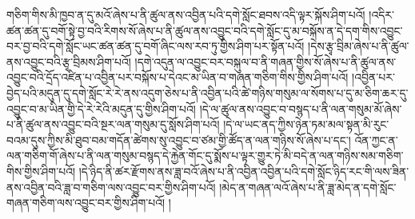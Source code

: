 གཅིག་གིས་མི་ཁྱབ་ན་དུ་མའོ་ཞེས་པ་ནི་ཚུལ་ནས་འབྱིན་པའི་དགེ་སློང་ཐབས་འདི་ལྟར་སྐོས་ཤིག་པའོ། །འདིར་ཚན་ཚན་དུ་བགོ་སྟེ་བྱ་བའི་རིགས་སོ་ཞེས་པ་ནི་ཚུལ་ནས་འབྱུང་བའི་དགེ་སློང་དུ་མ་བསྐོས་ན་དེ་དག་གིས་འབྱུང་བར་བྱ་བའི་དགེ་སློང་ཡང་ཚན་ཚན་དུ་བགོ་ཞིང་ལས་རབ་ཏུ་གྱིས་ཤིག་པར་སྟོན་པའོ། །དེས་རྩྭ་བྲིམ་ཞེས་པ་ནི་ཚུལ་ནས་འབྱུང་བའི་རྩྭ་བྲིམས་ཤིག་པའོ། །དགེ་འདུན་ལ་འབྱུང་བར་བསྐུལ་བ་ནི་གཞན་གྱིས་སོ་ཞེས་པ་ནི་ཚུལ་ནས་འབྱུང་བའི་དྲོད་འཛིན་པ་འབྱིན་པར་བསྐོས་པ་དེའང་མ་ཡིན་བ་གཞན་གཅིག་གིས་གྱིས་ཤིག་པའོ། །འབྱིན་པར་བྱེད་པའི་མདུན་དུ་དགེ་སློང་རེ་རེ་ནས་འདུག་ཅེས་པ་ནི་འབྱིན་པའི་ཚེ་གཉིས་གསུམ་ལ་སོགས་པ་དུ་མ་ཅིག་ཆར་དུ་འབྱུང་བ་མ་ཡིན་གྱི་དེ་རེ་རེའི་མདུན་དུ་གྱིས་ཤིག་པའོ། །དེ་ལ་ཚུལ་ནས་འབྱུང་བ་བསྙད་པ་ནི་ལན་གསུམ་མོ་ཞེས་པ་ནི་ཚུལ་ནས་འབྱུང་བའི་སྔར་ལན་གསུམ་དུ་སློས་ཤིག་པའོ། །དེ་ལ་ཡང་ནད་ཀྱིས་ཉེན་ཏམ་མལ་སྟན་མི་རུང་བའམ་དུས་ཀྱིས་མི་ཐུབ་བམ་གདོན་ཚེགས་སུ་འབྱུང་བ་ཙམ་གྱི་ཚོད་ན་ལན་གཉིས་སོ་ཞེས་པ་དང་། འོན་ཀྱང་ན་ལན་གཅིག་གོ་ཞེས་པ་ནི་ལན་གསུམ་བསྙད་དེ་རྐྱེན་གོང་དུ་སྨོས་པ་ལྟར་གྱུར་ཏེ་མི་བདེ་ན་ལན་གཉིས་སམ་གཅིག་གིས་གྱིས་ཤིག་པའོ། །དེ་ཉིད་ནི་ཚར་རྫོགས་ནས་ཟླ་བའོ་ཞེས་པ་ནི་འབྱིན་འབྱིན་པའི་དགེ་སློང་ཉིད་རང་གི་ལས་ཟིན་ནས་འབྱིན་བའི་ཟླ་བ་གཅིག་ལས་འབྱུང་བར་གྱིས་ཤིག་པའོ། །མེད་ན་གཞན་ལའོ་ཞེས་པ་ནི་ཟླ་མེད་ན་དགེ་སློང་གཞན་གཅིག་ལས་འབྱུང་བར་གྱིས་ཤིག་པའོ། །
